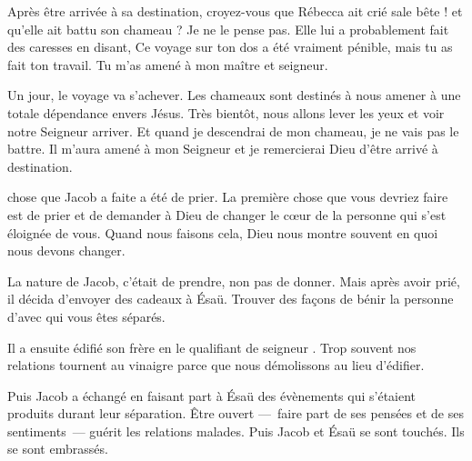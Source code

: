 Après être arrivée à sa destination,
 croyez-vous que Rébecca ait crié \og sale bête ! \fg{}
 et qu'elle ait battu son chameau ? Je ne le pense pas.
 Elle lui a probablement fait des caresses en disant,
 \og Ce voyage sur ton dos a été vraiment pénible,
 mais tu as fait ton travail. Tu m'as amené à mon maître et seigneur. \fg{}


Un jour, le voyage va s'achever. Les chameaux sont destinés à nous amener
 à une totale dépendance envers Jésus.
 Très bientôt, nous allons lever les yeux et voir notre Seigneur arriver.
 Et quand je descendrai de mon chameau, je ne vais pas le battre.
 Il m'aura amené à mon Seigneur et je remercierai Dieu
 d'être arrivé à destination. 

\dvrule







 chose que Jacob a faite a été de prier.
 La première chose que vous devriez faire est de prier et de demander
 à Dieu de changer le cœur de la personne qui s'est éloignée de vous.
 Quand nous faisons cela, Dieu nous montre souvent en quoi nous devons changer.

La nature de Jacob, c'était de prendre, non pas de donner.
 Mais après avoir prié, il décida d'envoyer des cadeaux à Ésaü.
 Trouver des façons de bénir la personne d'avec qui vous êtes séparés. 

Il a ensuite édifié son frère en le qualifiant de \og seigneur \fg{}.
 Trop souvent nos relations tournent au vinaigre parce que nous démolissons
 au lieu d'édifier. 

Puis Jacob a échangé en faisant part à Ésaü des évènements
 qui s'étaient produits durant leur séparation.
 Être ouvert ---~faire part de ses pensées et de ses sentiments~---
 guérit les relations malades.
 Puis Jacob et Ésaü se sont touchés. Ils se sont embrassés. 

